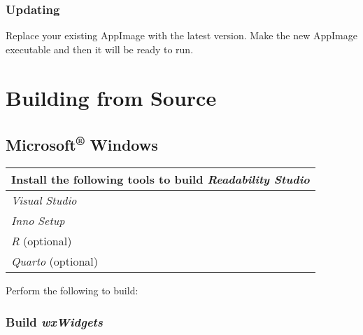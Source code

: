 \documentclass[
  letterpaper,
]{LegrandOrangeBook}
\begin{document}
\section*{Updating}\label{updating-2}


Replace your existing AppImage with the latest version. Make the new
AppImage executable and then it will be ready to run.

\part{Building from Source}

\chapter{\texorpdfstring{Microsoft\textsuperscript{®} Windows
\faWindows }{Microsoft® Windows }}\label{microsoft-windows-1}

\begin{longtable}[]{@{}
  >{\raggedright\arraybackslash}p{}@{}}
\toprule\noalign{}
\begin{minipage}[b]{\linewidth}\raggedright
Install the following tools to build \emph{Readability Studio}
\end{minipage} \\
\midrule\noalign{}
\endhead
\bottomrule\noalign{}
\endlastfoot
\emph{Visual Studio} \\
\emph{Inno Setup} \\
\emph{R} (optional) \\
\emph{Quarto} (optional) \\
\end{longtable}

Perform the following to build:

\section*{\texorpdfstring{Build
\emph{wxWidgets}}{Build wxWidgets}}\label{build-wxwidgets}

\end{document}
